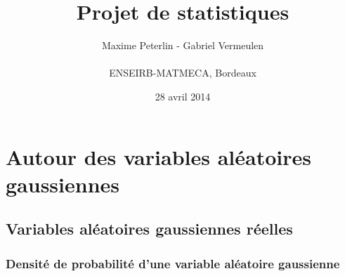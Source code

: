 \documentclass[11pt]{report}
\title{\textbf{Projet de statistiques}}
\author{{Maxime Peterlin - Gabriel Vermeulen }\\\\{ENSEIRB-MATMECA, Bordeaux}}
\date{28 avril 2014}
\begin{document}
\maketitle

\tableofcontents

\chapter{Autour des variables aléatoires gaussiennes}
	\section{Variables aléatoires gaussiennes réelles}
		\subsection{Densité de probabilité d'une variable aléatoire gaussienne}
\end{document}
